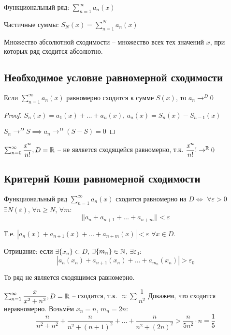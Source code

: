 Функциональный ряд: $\sum_{n=1}^{\infty} a_n(x)$

Частичные суммы: $S_N(x) = \sum_{n=1}^{N} a_n(x)$

Множество абсолютной сходимости -- множество всех тех значений $x$, при которых ряд сходится абсолютно.

\subsection{Необходимое условие равномерной сходимости}

Если $\sum_{n=1}^{\infty} a_n(x)$ равномерно сходится к сумме $S(x)$, то $a_n \to^D 0$

\begin{proof}
$S_n(x) = a_1(x) + \dots + a_n(x)$, $a_n(x) = S_n(x) - S_{n-1}(x)$

$S_n \to^D S \implies a_n \to^D (S - S) = 0$
\end{proof}

\begin{example}
$\sum_{n=0}^{\infty} \dfrac{x^n}{n!}, D = \mathbb{R}$ -- не является сходящейся равномерно, т.к. $\dfrac{x^n}{n!} ! \to^{\mathbb{R}} 0$
\end{example}

\subsection{Критерий Коши равномерной сходимости}
\begin{theorem}
Функциональный ряд $\sum_{n=1}^{\infty} a_n(x)$ сходится равномерно на $D \iff$ $\forall \varepsilon > 0$ $\exists N(\varepsilon)$, $\forall n \geq N$, $\forall m$: 
$$||a_n + a_{n + 1} + \dots + a_{n + m}|| < \varepsilon$$

Т.е. $|a_n(x) + a_{n + 1}(x) + \dots + a_{n + m}(x)| < \varepsilon$ $\forall x \in D$.
\end{theorem}

Отрицание: если $\exists \{x_n\} \subset D$, $\exists \{m_n\} \in \mathbb{N}$, $\exists \varepsilon_0$:
$$|a_n(x_n) + a_{n + 1}(x_n) + \dots + a_{m_n}(x_n)| > \varepsilon_0$$

То ряд не является сходящимся равномерно.

\begin{example}
$\sum_{n = 1}^{\infty} \dfrac{x}{x^2 + n^2}, D = \mathbb{R}$ -- сходится, т.к. $\approx \sum \dfrac{1}{n^2}$
      Докажем, что сходится неравномерно. Возьмём $x_n = n$, $m_n = 2n$:
      $$\dfrac{n}{n^2 + n^2} + \dfrac{n}{n^2 + (n + 1)^2} + \dots + \dfrac{n}{n^2 + (2n)^2} > \dfrac{n}{5n^2} \cdot n = \dfrac{1}{5}$$
\end{example}
